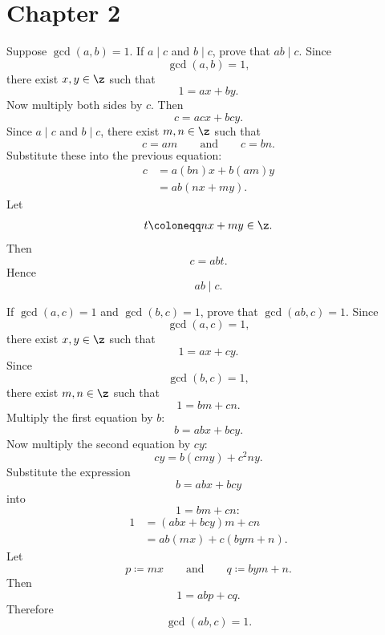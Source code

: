 
\section{Chapter 2}

\begin{problem}{
    Suppose $\gcd(a,b)=1$.
    If $a\mid c$ and $b\mid c$, prove that $ab\mid c$.
}
    Since
    \[
        \gcd(a,b)=1,
    \]
    there exist $x,y\in\z$ such that
    \[
        1=ax+by.
    \]
    Now multiply both sides by $c$.
    Then
    \[
        c=acx+bcy.
    \]
    Since $a\mid c$ and $b\mid c$, there exist $m,n\in\z$ such that
    \[
        c=am
        \qquad\text{and}\qquad
        c=bn.
    \]
    Substitute these into the previous equation:
    \begin{align*}
        c &= a(bn)x+b(am)y\\
        &= ab(nx+my).
    \end{align*}
    Let
    \[
        t\coloneqq nx+my\in\z.
    \]
    Then
    \[
        c=abt.
    \]
    Hence
    \[
        ab\mid c.
    \]
\end{problem}

\begin{problem}{
    If $\gcd(a,c)=1$ and $\gcd(b,c)=1$, prove that $\gcd(ab,c)=1$.
}
    Since
    \[
        \gcd(a,c)=1,
    \]
    there exist $x,y\in\z$ such that
    \[
        1=ax+cy.
    \]
    Since
    \[
        \gcd(b,c)=1,
    \]
    there exist $m,n\in\z$ such that
    \[
        1=bm+cn.
    \]
    Multiply the first equation by $b$:
    \[
        b=abx+bcy.
    \]
    Now multiply the second equation by $cy$:
    \[
        cy=b(cmy)+c^{2}ny.
    \]
    Substitute the expression
    \[
        b=abx+bcy
    \]
    into
    \[
        1=bm+cn:
    \]
    \begin{align*}
        1 &= (abx+bcy)m+cn\\
        &= ab(mx)+c(bym+n).
    \end{align*}
    Let
    \[
        p\coloneqq mx
        \qquad\text{and}\qquad
        q\coloneqq bym+n.
    \]
    Then
    \[
        1=abp+cq.
    \]
    Therefore
    \[
        \gcd(ab,c)=1.
    \]
\end{problem}

